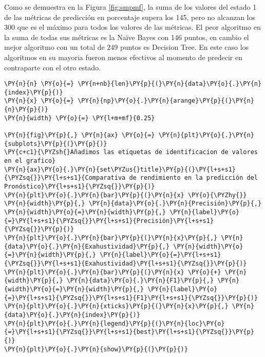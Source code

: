     Como se demuestra en la Figura \ref{fig:smpmf}, la suma de los valores del estado 1 de las métricas de predicción en porcentaje supera los 145, pero no alcanzan los 300 que es el máximo para todos los valores de las métricas. El peor algoritmo en la suma de todas sus métricas es la Naïve Bayes con 146 puntos, en cambio el mejor algoritmo con un total de 249 puntos es Decision Tree. En este caso los algoritmos en su mayoria fueron menos efectivos al momento de predecir en contraparte con el otro estado.

    \begin{tcolorbox}[breakable, size=fbox, boxrule=1pt, pad at break*=1mm,colback=cellbackground, colframe=cellborder]
\begin{Verbatim}[commandchars=\\\{\}]
\PY{n}{n} \PY{o}{=} \PY{n+nb}{len}\PY{p}{(}\PY{n}{data}\PY{o}{.}\PY{n}{index}\PY{p}{)}
\PY{n}{x} \PY{o}{=} \PY{n}{np}\PY{o}{.}\PY{n}{arange}\PY{p}{(}\PY{n}{n}\PY{p}{)}
\PY{n}{width} \PY{o}{=} \PY{l+m+mf}{0.25}

\PY{n}{fig}\PY{p}{,} \PY{n}{ax} \PY{o}{=} \PY{n}{plt}\PY{o}{.}\PY{n}{subplots}\PY{p}{(}\PY{p}{)}
\PY{c+c1}{\PYZsh{}Añadimos las etiquetas de identificacion de valores en el grafico}
\PY{n}{ax}\PY{o}{.}\PY{n}{set\PYZus{}title}\PY{p}{(}\PY{l+s+s1}{\PYZsq{}}\PY{l+s+s1}{Comparativa de rendimiento en la predicción del Pronóstico}\PY{l+s+s1}{\PYZsq{}}\PY{p}{)}
\PY{n}{plt}\PY{o}{.}\PY{n}{bar}\PY{p}{(}\PY{n}{x} \PY{o}{\PYZhy{}} \PY{n}{width}\PY{p}{,} \PY{n}{data}\PY{o}{.}\PY{n}{Precisión}\PY{p}{,} \PY{n}{width}\PY{o}{=}\PY{n}{width}\PY{p}{,} \PY{n}{label}\PY{o}{=}\PY{l+s+s1}{\PYZsq{}}\PY{l+s+s1}{Precisión}\PY{l+s+s1}{\PYZsq{}}\PY{p}{)}
\PY{n}{plt}\PY{o}{.}\PY{n}{bar}\PY{p}{(}\PY{n}{x}\PY{p}{,} \PY{n}{data}\PY{o}{.}\PY{n}{Exahustividad}\PY{p}{,} \PY{n}{width}\PY{o}{=}\PY{n}{width}\PY{p}{,} \PY{n}{label}\PY{o}{=}\PY{l+s+s1}{\PYZsq{}}\PY{l+s+s1}{Exahustividad}\PY{l+s+s1}{\PYZsq{}}\PY{p}{)}
\PY{n}{plt}\PY{o}{.}\PY{n}{bar}\PY{p}{(}\PY{n}{x} \PY{o}{+} \PY{n}{width}\PY{p}{,} \PY{n}{data}\PY{o}{.}\PY{n}{F1}\PY{p}{,} \PY{n}{width}\PY{o}{=}\PY{n}{width}\PY{p}{,} \PY{n}{label}\PY{o}{=}\PY{l+s+s1}{\PYZsq{}}\PY{l+s+s1}{F1}\PY{l+s+s1}{\PYZsq{}}\PY{p}{)}
\PY{n}{plt}\PY{o}{.}\PY{n}{xticks}\PY{p}{(}\PY{n}{x}\PY{p}{,} \PY{n}{data}\PY{o}{.}\PY{n}{index}\PY{p}{)}
\PY{n}{plt}\PY{o}{.}\PY{n}{legend}\PY{p}{(}\PY{n}{loc}\PY{o}{=}\PY{l+s+s1}{\PYZsq{}}\PY{l+s+s1}{best}\PY{l+s+s1}{\PYZsq{}}\PY{p}{)}
\PY{n}{plt}\PY{o}{.}\PY{n}{show}\PY{p}{(}\PY{p}{)}
\end{Verbatim}
\end{tcolorbox}

